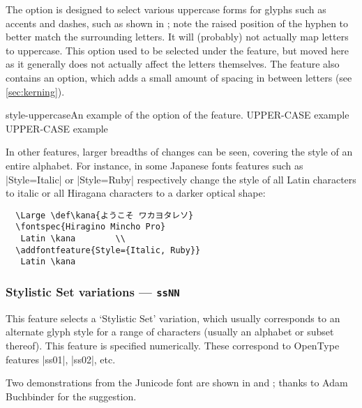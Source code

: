 \documentclass[a4paper]{l3doc}
\begin{document}
The  option is designed to select various
uppercase forms for glyphs such as accents and dashes, such as shown
in ; note the raised position of the hyphen
to better match the surrounding letters.
It will (probably) not actually map letters to uppercase.
This option used to be selected under the  feature, but moved here
as it generally does not actually affect the letters themselves.
The  feature also contains an  option,
which adds a small amount of spacing in between letters (see \vref{sec:kerning}).

\begin{Lexample}{style-uppercase}{An example of the  option of the  feature.}
   UPPER-CASE example \\
   UPPER-CASE example
\end{Lexample}


In other features, larger breadths of changes can be seen, covering
the style of an entire alphabet.
For instance, in some Japanese fonts features such as |Style=Italic| or |Style=Ruby|
respectively change the style of all Latin characters to italic or all Hiragana characters to a darker optical shape:
\begin{Verbatim}
  \Large \def\kana{ようこそ ワカヨタレソ}
  \fontspec{Hiragino Mincho Pro}
   Latin \kana        \\
  \addfontfeature{Style={Italic, Ruby}}
   Latin \kana
\end{Verbatim}


\subsubsection{Stylistic Set variations --- \texttt{ssNN}}
\label{sec:ot-ss}

This feature selects a `Stylistic Set' variation,
which usually corresponds to an alternate glyph style for a range of
characters (usually an alphabet or subset thereof).
This feature is specified numerically. These correspond to OpenType
features |ss01|, |ss02|, etc.

Two demonstrations from the Junicode
font
are shown in  and ; thanks to Adam
Buchbinder for the suggestion.
\end{document}
